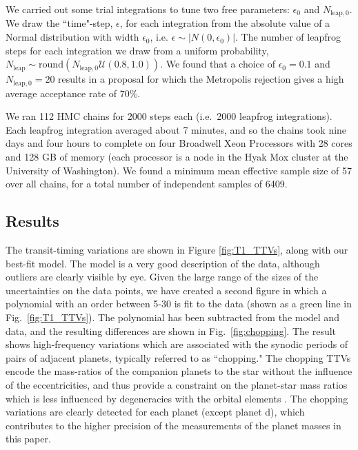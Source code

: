 \documentclass[twocolumn]{aastex63}
\begin{document}
We carried out some trial integrations to tune two free parameters:  $\epsilon_0$ and $N_{\mathrm{leap},0}$.  We draw the ``time"-step, $\epsilon$, for each integration from the absolute value of a Normal distribution with width $\epsilon_0$, i.e. $\epsilon \sim \vert N(0,\epsilon_0) \vert$.
The number of leapfrog steps for each integration we draw from a uniform probability,
$N_\mathrm{leap} \sim \mathrm{round}(N_{\mathrm{leap},0} \mathcal{U}(0.8,1.0))$.  We found that a choice of $\epsilon_0 = 0.1$
and $N_{\mathrm{leap},0} = 20$ results in a proposal for which the Metropolis rejection gives a high average acceptance rate of 70\%.

We ran 112 HMC chains for 2000 steps each (i.e.\ 2000 leapfrog integrations).   Each leapfrog integration averaged about 7 minutes, and so the chains took nine
days and four hours to complete on four Broadwell Xeon Processors with 28 cores and  128 GB of memory (each processor is a node in the Hyak Mox cluster at the University of Washington).
We found a minimum mean effective sample size of 57 over all chains, for a
total number of independent samples of 6409.

\subsection{Results}

The transit-timing variations are shown in Figure \ref{fig:T1_TTVs}, along
with our best-fit model.  The model is a very good description of the data,
although outliers are clearly visible by eye.  Given the large range of
the sizes of the uncertainties on the data points, we have created a
second figure in which a polynomial with an order between 5-30 is fit to
the data (shown as a green line in Fig.\ \ref{fig:T1_TTVs}).  The polynomial
has been subtracted from the model and data, and the resulting differences
are shown in Fig.\ \ref{fig:chopping}.  The result shows high-frequency variations which are
associated with the synodic periods of pairs of adjacent planets, typically
referred to as ``chopping."  The chopping TTVs encode the mass-ratios of
the companion planets to the star without the influence of the eccentricities,
and thus provide a constraint on the planet-star mass ratios which is less
influenced by degeneracies with the orbital elements \citep{Deck2015}.  The
chopping variations are clearly detected for each planet
(except planet d), which contributes to the higher
precision of the measurements of the planet
masses in this paper.
\end{document}
